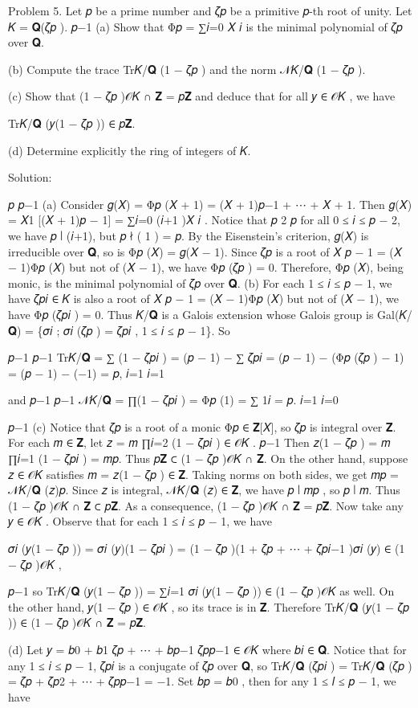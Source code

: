 \documentclass[UTF8,12pt]{ctexart}
\begin{document}
Problem 5. Let 𝑝 be a prime number and 𝜁𝑝 be a primitive 𝑝-th root of unity. Let 𝐾 = 𝐐(𝜁𝑝 ). 𝑝−1 (a) Show that Φ𝑝 = ∑𝑖=0 𝑋 𝑖 is the minimal polynomial of 𝜁𝑝 over 𝐐.

(b) Compute the trace Tr𝐾/𝐐 (1 − 𝜁𝑝 ) and the norm 𝒩𝐾/𝐐 (1 − 𝜁𝑝 ).

(c) Show that (1 − 𝜁𝑝 )𝒪𝐾 ∩ 𝐙 = 𝑝𝐙 and deduce that for all 𝑦 ∈ 𝒪𝐾 , we have

Tr𝐾/𝐐 (𝑦(1 − 𝜁𝑝 )) ∈ 𝑝𝐙.

(d) Determine explicitly the ring of integers of 𝐾.

Solution:

𝑝 𝑝−1 (a) Consider 𝑔(𝑋) = Φ𝑝 (𝑋 + 1) = (𝑋 + 1)𝑝−1 + ⋯ + 𝑋 + 1. Then 𝑔(𝑋) = 𝑋1 [(𝑋 + 1)𝑝 − 1] = ∑𝑖=0 (𝑖+1 )𝑋 𝑖 . Notice that 𝑝 2 𝑝 for all 0 ≤ 𝑖 ≤ 𝑝 − 2, we have 𝑝 ∣ (𝑖+1), but 𝑝 ∤ ( 1 ) = 𝑝. By the Eisenstein’s criterion, 𝑔(𝑋) is irreducible over 𝐐, so is Φ𝑝 (𝑋) = 𝑔(𝑋 − 1). Since 𝜁𝑝 is a root of 𝑋 𝑝 − 1 = (𝑋 − 1)Φ𝑝 (𝑋) but not of (𝑋 − 1), we have Φ𝑝 (𝜁𝑝 ) = 0. Therefore, Φ𝑝 (𝑋), being monic, is the minimal polynomial of 𝜁𝑝 over 𝐐. (b) For each 1 ≤ 𝑖 ≤ 𝑝 − 1, we have 𝜁𝑝𝑖 ∈ 𝐾 is also a root of 𝑋 𝑝 − 1 = (𝑋 − 1)Φ𝑝 (𝑋) but not of (𝑋 − 1), we have Φ𝑝 (𝜁𝑝𝑖 ) = 0. Thus 𝐾/𝐐 is a Galois extension whose Galois group is Gal(𝐾/𝐐) = \{𝜎𝑖 ; 𝜎𝑖 (𝜁𝑝 ) = 𝜁𝑝𝑖 , 1 ≤ 𝑖 ≤ 𝑝 − 1\}. So

𝑝−1 𝑝−1 Tr𝐾/𝐐 = ∑ (1 − 𝜁𝑝𝑖 ) = (𝑝 − 1) − ∑ 𝜁𝑝𝑖 = (𝑝 − 1) − (Φ𝑝 (𝜁𝑝 ) − 1) = (𝑝 − 1) − (−1) = 𝑝, 𝑖=1 𝑖=1

and 𝑝−1 𝑝−1 𝒩𝐾/𝐐 = ∏(1 − 𝜁𝑝𝑖 ) = Φ𝑝 (1) = ∑ 1𝑖 = 𝑝. 𝑖=1 𝑖=0

𝑝−1 (c) Notice that 𝜁𝑝 is a root of a monic Φ𝑝 ∈ 𝐙[𝑋], so 𝜁𝑝 is integral over 𝐙. For each 𝑚 ∈ 𝐙, let 𝑧 = 𝑚 ∏𝑖=2 (1 − 𝜁𝑝𝑖 ) ∈ 𝒪𝐾 . 𝑝−1 Then 𝑧(1 − 𝜁𝑝 ) = 𝑚 ∏𝑖=1 (1 − 𝜁𝑝𝑖 ) = 𝑚𝑝. Thus 𝑝𝐙 ⊂ (1 − 𝜁𝑝 )𝒪𝐾 ∩ 𝐙. On the other hand, suppose 𝑧 ∈ 𝒪𝐾 satisfies 𝑚 = 𝑧(1 − 𝜁𝑝 ) ∈ 𝐙. Taking norms on both sides, we get 𝑚𝑝 = 𝒩𝐾/𝐐 (𝑧)𝑝. Since 𝑧 is integral, 𝒩𝐾/𝐐 (𝑧) ∈ 𝐙, we have 𝑝 ∣ 𝑚𝑝 , so 𝑝 ∣ 𝑚. Thus (1 − 𝜁𝑝 )𝒪𝐾 ∩ 𝐙 ⊂ 𝑝𝐙. As a consequence, (1 − 𝜁𝑝 )𝒪𝐾 ∩ 𝐙 = 𝑝𝐙. Now take any 𝑦 ∈ 𝒪𝐾 . Observe that for each 1 ≤ 𝑖 ≤ 𝑝 − 1, we have

𝜎𝑖 (𝑦(1 − 𝜁𝑝 )) = 𝜎𝑖 (𝑦)(1 − 𝜁𝑝𝑖 ) = (1 − 𝜁𝑝 )(1 + 𝜁𝑝 + ⋯ + 𝜁𝑝𝑖−1 )𝜎𝑖 (𝑦) ∈ (1 − 𝜁𝑝 )𝒪𝐾 ,

𝑝−1 so Tr𝐾/𝐐 (𝑦(1 − 𝜁𝑝 )) = ∑𝑖=1 𝜎𝑖 (𝑦(1 − 𝜁𝑝 )) ∈ (1 − 𝜁𝑝 )𝒪𝐾 as well. On the other hand, 𝑦(1 − 𝜁𝑝 ) ∈ 𝒪𝐾 , so its trace is in 𝐙. Therefore Tr𝐾/𝐐 (𝑦(1 − 𝜁𝑝 )) ∈ (1 − 𝜁𝑝 )𝒪𝐾 ∩ 𝐙 = 𝑝𝐙.

(d) Let 𝑦 = 𝑏0 + 𝑏1 𝜁𝑝 + ⋯ + 𝑏𝑝−1 𝜁𝑝𝑝−1 ∈ 𝒪𝐾 where 𝑏𝑖 ∈ 𝐐. Notice that for any 1 ≤ 𝑖 ≤ 𝑝 − 1, 𝜁𝑝𝑖 is a conjugate of 𝜁𝑝 over 𝐐, so Tr𝐾/𝐐 (𝜁𝑝𝑖 ) = Tr𝐾/𝐐 (𝜁𝑝 ) = 𝜁𝑝 + 𝜁𝑝2 + ⋯ + 𝜁𝑝𝑝−1 = −1. Set 𝑏𝑝 = 𝑏0 , then for any 1 ≤ 𝑙 ≤ 𝑝 − 1, we have
\end{document}
